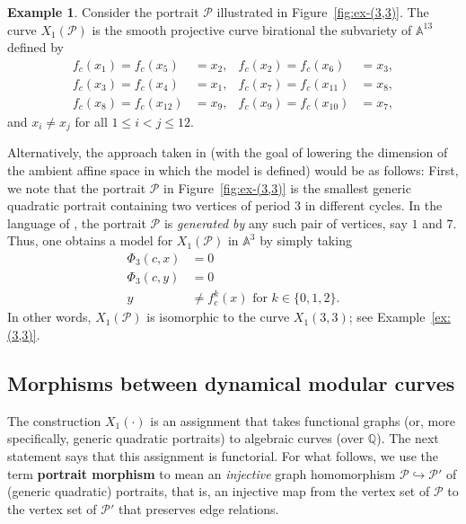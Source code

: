 \documentclass[12pt]{amsart}
\theoremstyle{definition}
\newtheorem{ex}[thm]{Example}
\newcommand{\bbA}{\mathbb{A}}
\newcommand{\bbQ}{\mathbb{Q}}
\newcommand{\calP}{\mathcal{P}}
\numberwithin{equation}{section}
\begin{document}
\begin{ex}\label{ex:(3,3)-revisit}
Consider the portrait $\calP$ illustrated in Figure~\ref{fig:ex-(3,3)}. The curve $X_1(\calP)$ is the smooth projective curve birational the subvariety of $\bbA^{13}$ defined by
    \begin{align*}
        f_c(x_1) = f_c(x_5) &= x_2, &
        f_c(x_2) = f_c(x_6) &= x_3,\\
        f_c(x_3) = f_c(x_4) &= x_1, &
        f_c(x_7) = f_c(x_{11}) &= x_8,\\
        f_c(x_8) = f_c(x_{12}) &= x_9, &
        f_c(x_9) = f_c(x_{10}) &= x_7,
    \end{align*}
and $x_i \ne x_j$ for all $1 \le i < j \le 12$.

Alternatively, the approach taken in \cite{doyle:2019} (with the goal of lowering the dimension of the ambient affine space in which the model is defined) would be as follows: First, we note that the portrait $\calP$ in Figure~\ref{fig:ex-(3,3)} is the smallest generic quadratic portrait containing two vertices of period $3$ in different cycles. In the language of \cite{doyle:2019}, the portrait $\calP$ is {\it generated by} any such pair of vertices, say $1$ and $7$. Thus, one obtains a model for $X_1(\calP)$ in $\bbA^3$ by simply taking
\begin{equation}\label{eq:X1(12(3,3))}
    \begin{split}
        \Phi_3(c,x) &= 0\\
        \Phi_3(c,y) &= 0\\
        y &\ne f_c^k(x) \text{ for } k \in \{0,1,2\}.
    \end{split}
\end{equation}
In other words, $X_1(\calP)$ is isomorphic to the curve $X_1(3,3)$; see Example~\ref{ex:(3,3)}.
\end{ex}

\subsection{Morphisms between dynamical modular curves}

The construction $X_1(\cdot)$ is an assignment that takes functional graphs (or, more specifically, generic quadratic portraits) to algebraic curves (over $\bbQ$). The next statement says that this assignment is functorial. For what follows, we use the term {\bf portrait morphism} to mean an {\it injective} graph homomorphism $\calP\hookrightarrow\calP'$ of (generic quadratic) portraits, that is, an injective map from the vertex set of $\calP$ to the vertex set of $\calP'$ that preserves edge relations.
\end{document}
